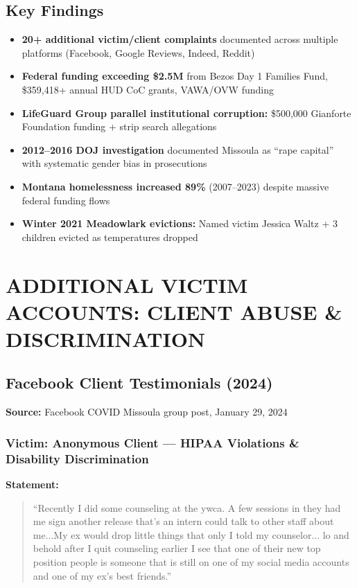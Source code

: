 \documentclass[11pt,letterpaper]{article}
\newenvironment{testimony}{%
    \begin{quote}\itshape\color{DarkGray}%
}{%
    \end{quote}%
}
\begin{document}
\subsection{Key Findings}

\begin{itemize}[leftmargin=*]
\item \textbf{20+ additional victim/client complaints} documented across multiple platforms (Facebook, Google Reviews, Indeed, Reddit)
\item \textbf{Federal funding exceeding \$2.5M} from Bezos Day 1 Families Fund, \$359,418+ annual HUD CoC grants, VAWA/OVW funding
\item \textbf{LifeGuard Group parallel institutional corruption:} \$500,000 Gianforte Foundation funding + strip search allegations
\item \textbf{2012--2016 DOJ investigation} documented Missoula as ``rape capital'' with systematic gender bias in prosecutions
\item \textbf{Montana homelessness increased 89\%} (2007--2023) despite massive federal funding flows
\item \textbf{Winter 2021 Meadowlark evictions:} Named victim Jessica Waltz + 3 children evicted as temperatures dropped
\end{itemize}

\newpage

\section{ADDITIONAL VICTIM ACCOUNTS: CLIENT ABUSE \& DISCRIMINATION}

\subsection{Facebook Client Testimonials (2024)}

\textbf{Source:} Facebook COVID Missoula group post, January 29, 2024

\subsubsection{Victim: Anonymous Client --- HIPAA Violations \& Disability Discrimination}

\textbf{Statement:}
\begin{testimony}
``Recently I did some counseling at the ywca. A few sessions in they had me sign another release that's an intern could talk to other staff about me...My ex would drop little things that only I told my counselor... lo and behold after I quit counseling earlier I see that one of their new top position people is someone that is still on one of my social media accounts and one of my ex's best friends.''
\end{testimony}
\end{document}
